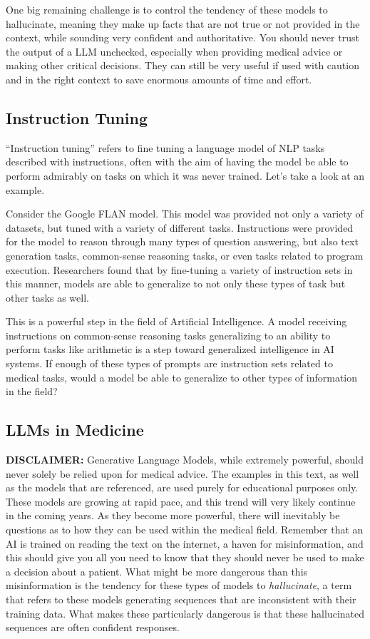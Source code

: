 One big remaining challenge is to control the tendency of these models to hallucinate, meaning they make up facts that are not true or not provided in the context, while sounding very confident and authoritative.
You should never trust the output of a LLM unchecked, especially when providing medical advice or making other critical decisions.
They can still be very useful if used with caution and in the right context to save enormous amounts of time and effort.

\subsection{Instruction Tuning}

“Instruction tuning” refers to fine tuning a language model of NLP tasks described with instructions, often with the aim of having the model
be able to perform admirably on tasks on which it was never trained. Let's take a look at an example.

Consider the Google FLAN\cite{chung2022scaling} model. This model was provided not only a variety of datasets, but
tuned with a variety of different tasks. Instructions were provided for the model to reason through many types of question answering, but also text
generation tasks, common-sense reasoning tasks, or even tasks related to program execution. Researchers found that by fine-tuning a variety of instruction
sets in this manner, models are able to generalize to not only these types of task but other tasks as well.

This is a powerful step in the field of Artificial Intelligence. A model receiving instructions on common-sense reasoning tasks generalizing to an ability to perform tasks like arithmetic is a step
toward generalized intelligence in AI systems. If enough of these types of prompts are instruction sets related to medical tasks, would a model be able to generalize to other types of information in the field?

\subsection{LLMs in Medicine}
\textbf{DISCLAIMER:} Generative Language Models, while extremely powerful, should never solely be relied upon for medical advice. The examples in this text,
as well as the models that are referenced, are used purely for educational purposes only.
These models are growing at rapid pace, and this trend will very likely continue in the coming years. As they become more powerful, there
will inevitably be questions as to how they can be used within the medical field. Remember that an AI is trained on reading the text on the internet,
a haven for misinformation, and this should give you all you need to know that they should never be used to make a decision about a patient. What might be more dangerous than this
misinformation is the tendency for these types of models to \textit{hallucinate}, a term that refers to these models generating sequences that are inconsistent with their training data.
What makes these particularly dangerous is that these hallucinated sequences are often confident responses.

